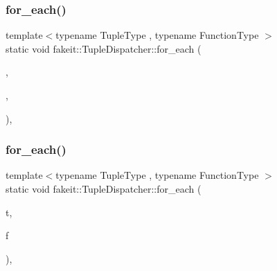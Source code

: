 \mbox{\label{structfakeit_1_1TupleDispatcher_af22c1fae8c695f722da986df9af411ca}} 
\subsubsection{\texorpdfstring{for\_each()}{for\_each()}\hspace{0.1cm}{\footnotesize\ttfamily [10/54]}}
{\footnotesize\ttfamily template$<$typename Tuple\+Type , typename Function\+Type $>$ \\
static void fakeit\+::\+Tuple\+Dispatcher\+::for\+\_\+each (\begin{DoxyParamCaption}\item[{Tuple\+Type \&\&}]{,  }\item[{Function\+Type \&}]{,  }\item[{std\+::integral\+\_\+constant$<$ size\+\_\+t, std\+::tuple\+\_\+size$<$ typename std\+::remove\+\_\+reference$<$ Tuple\+Type $>$\+::type $>$\+::value $>$}]{ }\end{DoxyParamCaption})\hspace{0.3cm}{\ttfamily [inline]}, {\ttfamily [static]}}

\mbox{\label{structfakeit_1_1TupleDispatcher_a8fd292a71795aae0aba215dad28ee4c2}} 
\subsubsection{\texorpdfstring{for\_each()}{for\_each()}\hspace{0.1cm}{\footnotesize\ttfamily [11/54]}}
{\footnotesize\ttfamily template$<$typename Tuple\+Type , typename Function\+Type $>$ \\
static void fakeit\+::\+Tuple\+Dispatcher\+::for\+\_\+each (\begin{DoxyParamCaption}\item[{Tuple\+Type \&\&}]{t,  }\item[{Function\+Type \&}]{f }\end{DoxyParamCaption})\hspace{0.3cm}{\ttfamily [inline]}, {\ttfamily [static]}}

